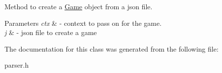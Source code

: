 Method to create a \hyperlink{classGame}{Game} object from a json file. 
\begin{DoxyParams}{Parameters}
{\em ctx} & -\/ context to pass on for the game. \\
\hline
{\em j} & -\/ json file to create a game \\
\hline
\end{DoxyParams}


The documentation for this class was generated from the following file\+:\begin{DoxyCompactItemize}
\item 
parser.\+h\end{DoxyCompactItemize}
